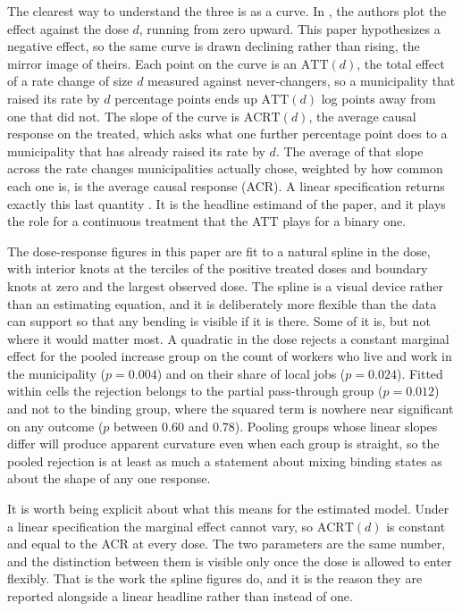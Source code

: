 \documentclass[12pt]{article}
\begin{document}
The clearest way to understand the three is as a curve. In \citet{bakerDifferenceinDifferencesDesignsPractitioners2025}, the authors plot the
effect against the dose $d$, running from zero upward. This paper hypothesizes a negative effect, so the same curve is drawn declining rather than rising, the mirror image of theirs. Each point on the curve is
an $\mathrm{ATT}(d)$, the total effect of a rate change of size $d$
measured against never-changers, so a municipality that raised its rate
by $d$ percentage points ends up $\mathrm{ATT}(d)$ log points away from one
that did not. The slope of the curve is $\mathrm{ACRT}(d)$, the average causal
response on the treated, which asks what one further percentage point
does to a municipality that has already raised its rate by $d$. The
average of that slope across the rate changes municipalities actually
chose, weighted by how common each one is, is the average causal response
(ACR). A linear specification returns exactly this last quantity
\citep{bakerDifferenceinDifferencesDesignsPractitioners2025,
dechaisemartin2024}. It is the headline estimand of the paper, and it
plays the role for a continuous treatment that the ATT plays for a binary
one.

The dose-response figures in this paper are fit to a natural spline in the dose, with interior
knots at the terciles of the positive treated doses and boundary knots at
zero and the largest observed dose. The spline is a visual device rather
than an estimating equation, and it is deliberately more flexible than
the data can support so that any bending is visible if it is there. Some
of it is, but not where it would matter most. A quadratic in the dose
rejects a constant marginal effect for the pooled increase group on the
count of workers who live and work in the municipality ($p = 0.004$) and
on their share of local jobs ($p = 0.024$). Fitted within cells the
rejection belongs to the partial pass-through group ($p = 0.012$) and not
to the binding group, where the squared term is nowhere near significant
on any outcome ($p$ between $0.60$ and $0.78$). Pooling groups whose
linear slopes differ will produce apparent curvature even when each group
is straight, so the pooled rejection is at least as much a statement about
mixing binding states as about the shape of any one response.

It is worth being explicit about what this means for the estimated model.
Under a linear specification the marginal effect cannot vary, so
$\text{ACRT}(d)$ is constant and equal to the ACR at every dose. The two
parameters are the same number, and the distinction between them is
visible only once the dose is allowed to enter flexibly. That is the work
the spline figures do, and it is the reason they are reported alongside a
linear headline rather than instead of one.
\end{document}
